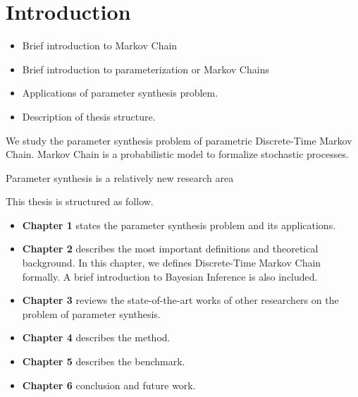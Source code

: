 \chapter{Introduction} 
{\color{red}
  \begin{itemize}
  \item Brief introduction to Markov Chain
  \item Brief introduction to parameterization or Markov Chains
  \item Applications of parameter synthesis problem.
  \item Description of thesis structure.
  \end{itemize}
}
We study the parameter synthesis problem of parametric Discrete-Time Markov
Chain. Markov Chain is a probabilistic model to formalize stochastic
processes. 

Parameter synthesis is a relatively new research area \cite{katoen2016probabilistic}

This thesis is structured as follow.

\begin{itemize}
\item \textbf{Chapter 1} states the parameter synthesis problem and its applications.
\item \textbf{Chapter 2} describes the most important definitions and
  theoretical background. In this chapter, we defines Discrete-Time Markov Chain
  formally. A brief introduction to Bayesian Inference is also included.
\item \textbf{Chapter 3} reviews the state-of-the-art works of other researchers
  on the problem of parameter synthesis.
\item \textbf{Chapter 4} describes the method. 
\item \textbf{Chapter 5} describes the benchmark. 
\item \textbf{Chapter 6} conclusion and future work.
\end{itemize}

